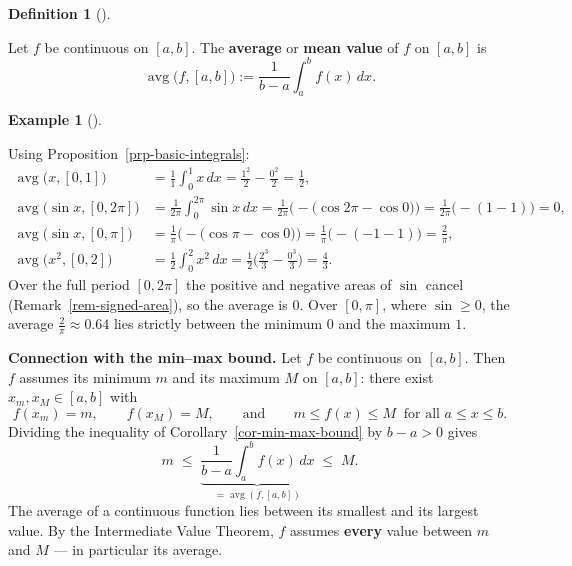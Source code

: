 \documentclass[
  letterpaper,
  DIV=11,
  numbers=noendperiod]{scrreprt}
\theoremstyle{plain}
\theoremstyle{plain}
\theoremstyle{definition}
\newtheorem{definition}{Definition}[chapter]
\theoremstyle{definition}
\theoremstyle{definition}
\newtheorem{example}{Example}[chapter]
\theoremstyle{plain}
\theoremstyle{plain}
\theoremstyle{remark}
\begin{document}
\begin{definition}[]\protect\hypertarget{def-average-value}{}\label{def-average-value}

\hfill\break
Let \(f\) be continuous on \([a,b]\). The \textbf{average} or
\textbf{mean value} of \(f\) on \([a,b]\) is \[
\operatorname{avg}\big(f,[a,b]\big) := \frac1{b-a}\int_a^b f(x)\,dx .
\]

\end{definition}

\begin{example}[]\protect\hypertarget{exm-averages}{}\label{exm-averages}

\hfill\break
Using Proposition~\ref{prp-basic-integrals}: \[
\begin{aligned}
\operatorname{avg}\big(x,[0,1]\big) &= \frac11\int_0^1 x\,dx = \frac{1^2}{2}-\frac{0^2}{2} = \frac12, \\[4pt]
\operatorname{avg}\big(\sin x,[0,2\pi]\big) &= \frac1{2\pi}\int_0^{2\pi}\sin x\,dx
= \frac1{2\pi}\Big(-\big(\cos 2\pi - \cos 0\big)\Big) = \frac1{2\pi}\big(-(1-1)\big) = 0, \\[4pt]
\operatorname{avg}\big(\sin x,[0,\pi]\big) &= \frac1\pi\Big(-\big(\cos\pi-\cos0\big)\Big)
= \frac1\pi\big(-(-1-1)\big) = \frac2\pi, \\[4pt]
\operatorname{avg}\big(x^2,[0,2]\big) &= \frac12\int_0^2x^2\,dx = \frac12\Big(\frac{2^3}{3}-\frac{0^3}{3}\Big)
= \frac43 .
\end{aligned}
\] Over the full period \([0,2\pi]\) the positive and negative areas of
\(\sin\) cancel (Remark~\ref{rem-signed-area}), so the average is \(0\).
Over \([0,\pi]\), where \(\sin\ge0\), the average
\(\frac2\pi\approx0.64\) lies strictly between the minimum \(0\) and the
maximum \(1\).

\end{example}

\textbf{Connection with the min--max bound.} Let \(f\) be continuous on
\([a,b]\). Then \(f\) assumes its minimum \(m\) and its maximum \(M\) on
\([a,b]\): there exist \(x_m, x_M\in[a,b]\) with \[
f(x_m) = m, \qquad f(x_M)=M, \qquad\text{and}\qquad m\le f(x)\le M \ \text{ for all } a\le x\le b.
\] Dividing the inequality of Corollary~\ref{cor-min-max-bound} by
\(b-a>0\) gives \[
m \;\le\; \underbrace{\frac1{b-a}\int_a^b f(x)\,dx}_{=\operatorname{avg}(f,[a,b])} \;\le\; M .
\] The average of a continuous function lies between its smallest and
its largest value. By the Intermediate Value Theorem, \(f\) assumes
\textbf{every} value between \(m\) and \(M\) --- in particular its
average.
\end{document}
